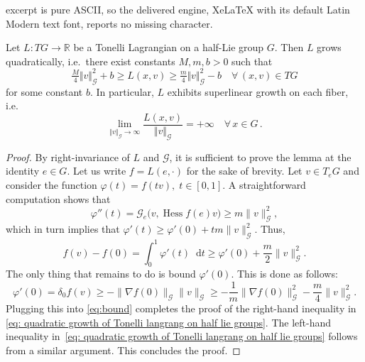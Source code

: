 \documentclass[10pt,a4paper]{amsart}
\def\G{\mathcal{G}}
\def\RR{{\mathbb R}}
\def\d{\delta}
\begin{document}
excerpt is pure ASCII, so the delivered engine, XeLaTeX with its default Latin Modern text font, reports no missing character.
\begin{lem}\label{Ilem: Tonelli Langrangians}
    Let $L:TG \to \RR$ be a Tonelli Lagrangian on a half-Lie group $G$. Then \( L \) grows  quadratically, i.e.\ there exist constants \( M, m, b > 0 \) such that
        \begin{equation}\label{eq: quadratic growth of Tonelli langrang on half lie groups}
          \tfrac{M}{4} \Vert v\Vert_{\G}^2 + b\geq  L(x,v) \geq \tfrac{m}{4} \Vert v\Vert_{\G}^2 - b \quad \forall\, (x,v)\in TG
        \end{equation}
        for some constant \( b \).
        In particular, $L$ exhibits superlinear growth on each fiber, i.e.\ 
        \[
            \lim_{\Vert v\Vert_{\G}\to \infty} \frac{L(x,v)}{\Vert v\Vert_{\G}} = +\infty 
            \quad \forall\, x \in G\, .
        \]
\end{lem}

\begin{proof}
    By right-invariance of \( L \) and \( \mathcal{G} \), it is sufficient to prove the lemma at the identity \( e \in G \). Let us write \( f = L(e, \cdot) \) for the sake of brevity. Let \( v \in T_e G \) and consider the function \( \varphi(t) = f(tv), \; t \in [0, 1] \). A straightforward computation shows that
    \begin{equation*}
        \varphi''(t) = \mathcal{G}_e \big(v, \operatorname{Hess}f (e) v \big) \geq m \| v \|^2_\mathcal{G},
    \end{equation*}
    which in turn implies that \( \varphi'(t) \geq \varphi'(0) + t m \| v \|^2_\mathcal{G} \).
    Thus,
    \begin{equation}\label{eq:bound}
        f(v) - f(0) = \int_0^1 \varphi'(t) \mathop{}\!\mathrm{d}t
        \geq \varphi'(0) + \frac{m}{2} \| v \|^2_\mathcal{G}.
    \end{equation}
    The only thing that remains to do is bound \( \varphi'(0) \). This is done as follows:
    \begin{equation*}
       \varphi'(0) = \d_0 f(v) 
            \geq - \| \nabla f(0) \|_\mathcal{G} \| v \|_\mathcal{G} 
            \geq - \frac{1}{m} \| \nabla f(0) \|_\mathcal{G}^2 - \frac{m}{4} \| v \|_\mathcal{G}^2.
    \end{equation*}
    Plugging this into \eqref{eq:bound} completes the proof of the right-hand inequality in \eqref{eq: quadratic growth of Tonelli langrang on half lie groups}. The left-hand inequality in~\eqref{eq: quadratic growth of Tonelli langrang on half lie groups} follows from a similar argument. This concludes the proof.
\end{proof}
\end{document}
